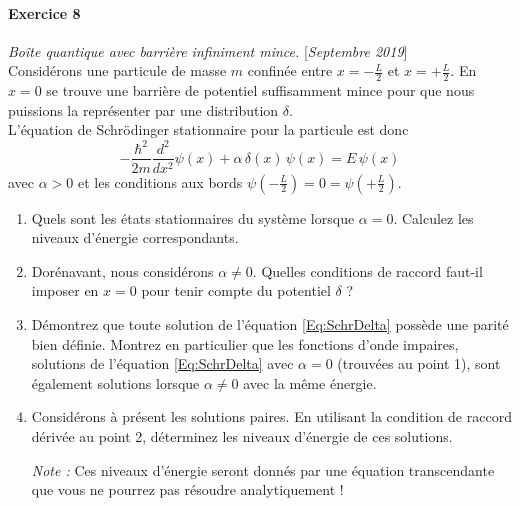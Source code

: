 \newpage

\paragraph{Exercice 8} \textit{Boîte quantique avec barrière infiniment mince.} \hfill [\textit{Septembre 2019}] \\

Considérons une particule de masse $m$ confinée entre $x= -\frac{L}{2}$ et $x =+\frac{L}{2}$. En $x=0$ se trouve une barrière de potentiel suffisamment mince pour que nous puissions la représenter par une distribution $\delta$. \\

L'équation de Schrödinger stationnaire pour la particule est donc
\begin{equation}
-\frac{\hbar^2}{2m} \frac{d^2}{d x^2} \psi(x) + \alpha\, \delta(x)\, \psi(x)= E\, \psi(x)
\label{Eq:SchrDelta}
\end{equation}
avec $\alpha>0$ et les conditions aux bords $\psi(-\frac{L}{2})=0=\psi(+\frac{L}{2})$.

\begin{enumerate}
\item Quels sont les états stationnaires du système lorsque $\alpha = 0$. Calculez les niveaux d'énergie correspondants.

\item Dorénavant, nous considérons $\alpha \neq  0$. Quelles conditions de raccord faut-il imposer en $x=0$ pour tenir compte du potentiel $\delta$ ?

\item
Démontrez que toute solution de l'équation  \eqref{Eq:SchrDelta} possède une parité bien définie. Montrez en particulier que les fonctions d'onde impaires, solutions de l'équation \eqref{Eq:SchrDelta} avec $\alpha=0$ (trouvées au point 1), sont également solutions lorsque $\alpha\neq 0$ avec la même énergie.

\item Considérons à présent les solutions paires. En utilisant la condition de raccord dérivée au point 2, déterminez les niveaux d'énergie de ces solutions. 

\textit{Note :} Ces niveaux d'énergie seront donnés par une équation transcendante que vous ne pourrez pas résoudre analytiquement !
\end{enumerate}

